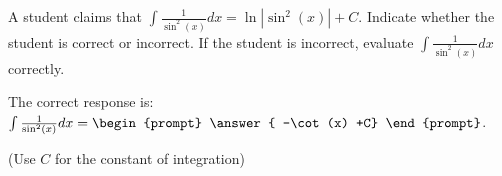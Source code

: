 \documentclass{ximera}
\author{Jim Talamo}
\begin{document}
\begin{exercise}
A student claims that $\int \frac{1}{\sin^2(x)} dx = \ln|\sin^2(x)|+C$.  Indicate whether the student is correct or incorrect.  If the student is incorrect, evaluate $\int \frac{1}{\sin^2(x)} dx $ correctly.

\begin{multipleChoice}  

The correct response is: $\int \frac{1}{\sin^2(x)} dx = \begin{prompt} \answer{ -\cot(x) +C} \end{prompt} $.
\end{multipleChoice}

\begin{prompt} (Use $C$ for the constant of integration) \end{prompt}

\end{exercise}
\end{document}
